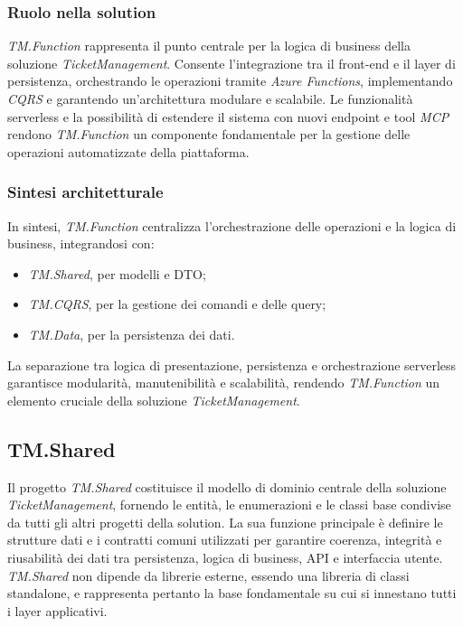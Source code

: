 \subsubsection{Ruolo nella solution}

\textit{TM.Function} rappresenta il punto centrale per la logica di business della soluzione \textit{TicketManagement}. Consente l'integrazione tra il front-end e il layer di persistenza, orchestrando le operazioni tramite \textit{Azure Functions}, implementando \textit{CQRS} e garantendo un'architettura modulare e scalabile. Le funzionalità serverless e la possibilità di estendere il sistema con nuovi endpoint e tool \textit{MCP} rendono \textit{TM.Function} un componente fondamentale per la gestione delle operazioni automatizzate della piattaforma.

\subsubsection{Sintesi architetturale}

In sintesi, \textit{TM.Function} centralizza l'orchestrazione delle operazioni e la logica di business, integrandosi con:
\begin{itemize}
\item \textit{TM.Shared}, per modelli e DTO;

\item \textit{TM.CQRS}, per la gestione dei comandi e delle query;

\item \textit{TM.Data}, per la persistenza dei dati.
\end{itemize}

La separazione tra logica di presentazione, persistenza e orchestrazione serverless garantisce modularità, manutenibilità e scalabilità, rendendo \textit{TM.Function} un elemento cruciale della soluzione \textit{TicketManagement}.

\subsection{TM.Shared}

Il progetto \textit{TM.Shared} costituisce il modello di dominio centrale della soluzione \textit{TicketManagement}, fornendo le entità, le enumerazioni e le classi base condivise da tutti gli altri progetti della solution. La sua funzione principale è definire le strutture dati e i contratti comuni utilizzati per garantire coerenza, integrità e riusabilità dei dati tra persistenza, logica di business, API e interfaccia utente. \textit{TM.Shared} non dipende da librerie esterne, essendo una libreria di classi standalone, e rappresenta pertanto la base fondamentale su cui si innestano tutti i layer applicativi.

